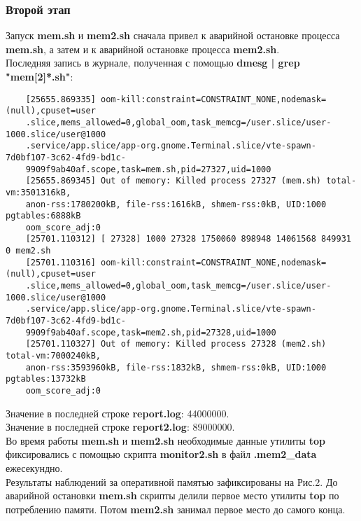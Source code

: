 \documentclass{article}
\begin{document}
\subsubsection*{Второй этап}
Запуск \textbf{mem.sh} и \textbf{mem2.sh} сначала привел к аварийной остановке процесса \textbf{mem.sh}, а затем и к аварийной остановке процесса \textbf{mem2.sh}. \\
Последняя запись в журнале, полученная с помощью \textbf{dmesg | grep "mem[2]*.sh"}:
\begin{verbatim}
    [25655.869335] oom-kill:constraint=CONSTRAINT_NONE,nodemask=(null),cpuset=user
    .slice,mems_allowed=0,global_oom,task_memcg=/user.slice/user-1000.slice/user@1000
    .service/app.slice/app-org.gnome.Terminal.slice/vte-spawn-7d0bf107-3c62-4fd9-bd1c-
    9909f9ab40af.scope,task=mem.sh,pid=27327,uid=1000
    [25655.869345] Out of memory: Killed process 27327 (mem.sh) total-vm:3501316kB, 
    anon-rss:1780200kB, file-rss:1616kB, shmem-rss:0kB, UID:1000 pgtables:6888kB 
    oom_score_adj:0
    [25701.110312] [ 27328] 1000 27328 1750060 898948 14061568 849931 0 mem2.sh
    [25701.110316] oom-kill:constraint=CONSTRAINT_NONE,nodemask=(null),cpuset=user
    .slice,mems_allowed=0,global_oom,task_memcg=/user.slice/user-1000.slice/user@1000
    .service/app.slice/app-org.gnome.Terminal.slice/vte-spawn-7d0bf107-3c62-4fd9-bd1c-
    9909f9ab40af.scope,task=mem2.sh,pid=27328,uid=1000
    [25701.110327] Out of memory: Killed process 27328 (mem2.sh) total-vm:7000240kB, 
    anon-rss:3593960kB, file-rss:1832kB, shmem-rss:0kB, UID:1000 pgtables:13732kB 
    oom_score_adj:0
\end{verbatim}
Значение в последней строке \textbf{report.log}: 44000000. \\
Значение в последней строке \textbf{report2.log}: 89000000. \\
Во время работы \textbf{mem.sh} и \textbf{mem2.sh} необходимые данные утилиты \textbf{top} фиксировались с помощью скрипта \textbf{monitor2.sh} в файл \textbf{.mem2\_data} ежесекундно. \\
Результаты наблюдений за оперативной памятью зафиксированы на Рис.2. До аварийной остановки \textbf{mem.sh} скрипты делили первое место утилиты \textbf{top} по потреблению памяти. Потом \textbf{mem2.sh} занимал первое место до самого конца.
\end{document}
